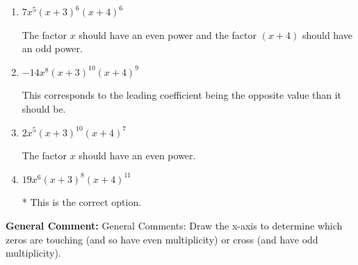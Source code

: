 \documentclass{extbook}[14pt]
\begin{document}
\begin{enumerate}
{\begin{enumerate}[label=\Alph*.]
The factor $(x + 4)$ should have an odd power and the leading coefficient should be the opposite sign.
\item \( 7x^{5} (x + 3)^{6} (x + 4)^{6} \)

The factor $x$ should have an even power and the factor $(x + 4)$ should have an odd power.
\item \( -14x^{8} (x + 3)^{10} (x + 4)^{9} \)

This corresponds to the leading coefficient being the opposite value than it should be.
\item \( 2x^{5} (x + 3)^{10} (x + 4)^{7} \)

The factor $x$ should have an even power.
\item \( 19x^{6} (x + 3)^{8} (x + 4)^{11} \)

* This is the correct option.
\end{enumerate}

\textbf{General Comment:} General Comments: Draw the x-axis to determine which zeros are touching (and so have even multiplicity) or cross (and have odd multiplicity).
}
\end{enumerate}
\end{document}
